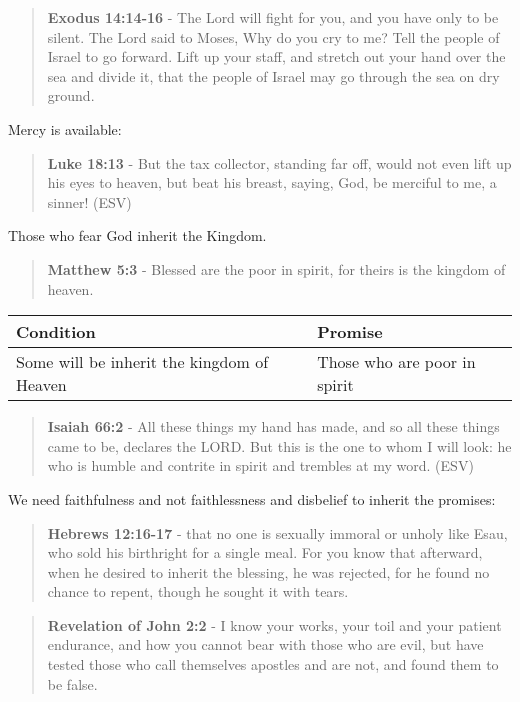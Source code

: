 \documentclass[11pt]{article}
\begin{document}
\begin{quote}
\textbf{Exodus 14:14-16} - The Lord will fight for you, and you have only to be silent.  The Lord said to Moses, Why do you cry to me? Tell the people of Israel to go forward.  Lift up your staff, and stretch out your hand over the sea and divide it, that the people of Israel may go through the sea on dry ground.
\end{quote}

Mercy is available:

\begin{quote}
\textbf{Luke 18:13} - But the tax collector, standing far off, would not even lift up his eyes to heaven, but beat his breast, saying, God, be merciful to me, a sinner! (ESV)
\end{quote}

Those who fear God inherit the Kingdom.

\begin{quote}
\textbf{Matthew 5:3} - Blessed are the poor in spirit, for theirs is the kingdom of heaven.
\end{quote}

\begin{center}
\begin{tabular}{ll}
Condition & Promise\\[0pt]
\hline
Some will be inherit the kingdom of Heaven & Those who are poor in spirit\\[0pt]
\end{tabular}
\end{center}

\begin{quote}
\textbf{Isaiah 66:2} - All these things my hand has made, and so all these things came to be, declares the LORD. But this is the one to whom I will look: he who is humble and contrite in spirit and trembles at my word. (ESV)
\end{quote}

We need faithfulness and not faithlessness and disbelief to inherit the promises:

\begin{quote}
\textbf{Hebrews 12:16-17} - that no one is sexually immoral or unholy like Esau, who sold his birthright for a single meal. For you know that afterward, when he desired to inherit the blessing, he was rejected, for he found no chance to repent, though he sought it with tears.
\end{quote}

\begin{quote}
\textbf{Revelation of John 2:2} - I know your works, your toil and your patient endurance, and how you cannot bear with those who are evil, but have tested those who call themselves apostles and are not, and found them to be false.
\end{quote}
\end{document}
